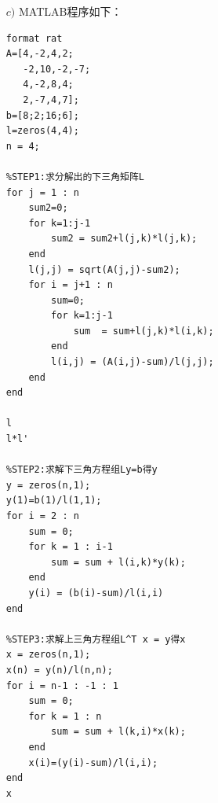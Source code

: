 \documentclass[12pt,a4paper,utf8]{ctexart}
\begin{document}
\begin{enumerate}
\begin{enumerate}
        
    \item[$c)$] MATLAB程序如下：
    \begin{lstlisting}[frame=single]
format rat
A=[4,-2,4,2;
   -2,10,-2,-7;
   4,-2,8,4;
   2,-7,4,7];
b=[8;2;16;6];
l=zeros(4,4);
n = 4;

%STEP1:求分解出的下三角矩阵L
for j = 1 : n
    sum2=0;
    for k=1:j-1
        sum2 = sum2+l(j,k)*l(j,k);   
    end
    l(j,j) = sqrt(A(j,j)-sum2);
    for i = j+1 : n
        sum=0;
        for k=1:j-1
            sum  = sum+l(j,k)*l(i,k);   
        end
        l(i,j) = (A(i,j)-sum)/l(j,j);
    end
end

l
l*l'

%STEP2:求解下三角方程组Ly=b得y
y = zeros(n,1);
y(1)=b(1)/l(1,1);
for i = 2 : n
    sum = 0;
    for k = 1 : i-1
        sum = sum + l(i,k)*y(k); 
    end
    y(i) = (b(i)-sum)/l(i,i)
end

%STEP3:求解上三角方程组L^T x = y得x
x = zeros(n,1);
x(n) = y(n)/l(n,n);
for i = n-1 : -1 : 1
    sum = 0;
    for k = 1 : n
        sum = sum + l(k,i)*x(k);
    end
    x(i)=(y(i)-sum)/l(i,i);
end
x


\end{lstlisting}
\end{enumerate}
\end{enumerate}
\end{document}
